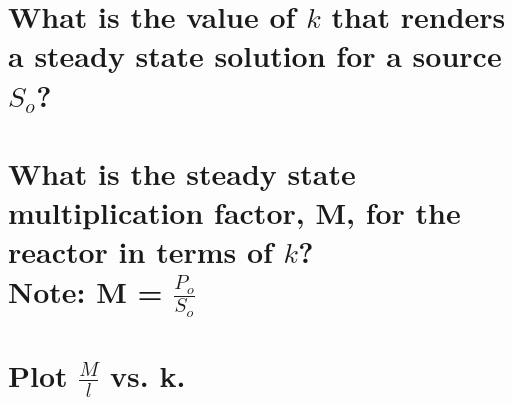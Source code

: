 \begin{questions}
{\begin{parts}
\part[2]{What is the value of $k$ that renders a steady state solution for a source $S_o$?}

\part[1]{What is the steady state multiplication factor, M, for the reactor in terms of $k$?\\
\textbf{Note}: M = $\displaystyle\frac{P_o}{S_o}$}

\part[1]{Plot $\displaystyle \frac{M}{\textit{l}}$ vs. k.}
\end{parts}}
\end{questions}
\ifprintanswers
\begin{landscape}

\end{landscape}
\fi


